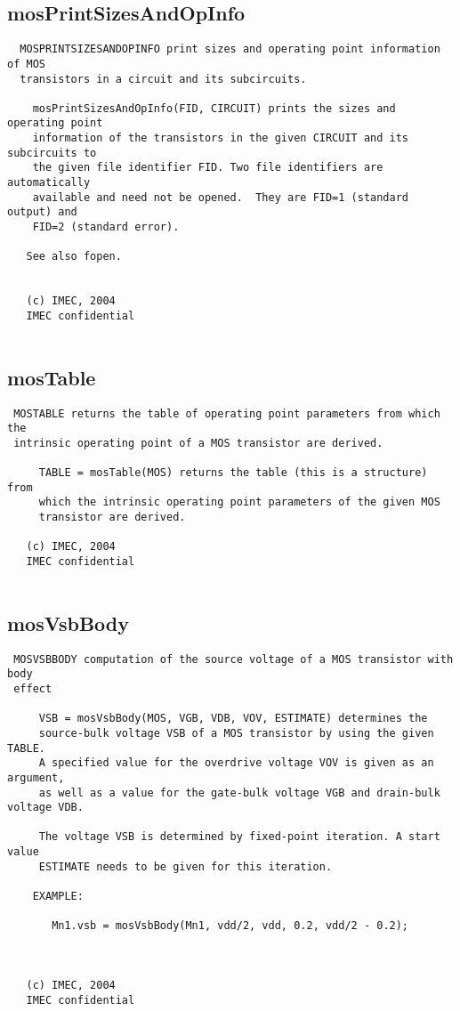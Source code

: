 \newpage
\subsection{mosPrintSizesAndOpInfo}
\label{sec:mosPrintSizesAndOpInfo}
\begin{verbatim}
  MOSPRINTSIZESANDOPINFO print sizes and operating point information of MOS
  transistors in a circuit and its subcircuits.
 
    mosPrintSizesAndOpInfo(FID, CIRCUIT) prints the sizes and operating point
    information of the transistors in the given CIRCUIT and its subcircuits to
    the given file identifier FID. Two file identifiers are automatically
    available and need not be opened.  They are FID=1 (standard output) and
    FID=2 (standard error).
 
   See also fopen.
 
 
   (c) IMEC, 2004
   IMEC confidential 
 

\end{verbatim}

\newpage
\subsection{mosTable}
\label{sec:mosTable}
\begin{verbatim}
 MOSTABLE returns the table of operating point parameters from which the
 intrinsic operating point of a MOS transistor are derived.
 
     TABLE = mosTable(MOS) returns the table (this is a structure) from
     which the intrinsic operating point parameters of the given MOS
     transistor are derived. 
 
   (c) IMEC, 2004
   IMEC confidential 
 

\end{verbatim}

\newpage
\subsection{mosVsbBody}
\label{sec:mosVsbBody}
\begin{verbatim}
 MOSVSBBODY computation of the source voltage of a MOS transistor with body
 effect
 
     VSB = mosVsbBody(MOS, VGB, VDB, VOV, ESTIMATE) determines the
     source-bulk voltage VSB of a MOS transistor by using the given TABLE. 
     A specified value for the overdrive voltage VOV is given as an argument, 
     as well as a value for the gate-bulk voltage VGB and drain-bulk voltage VDB. 
 
     The voltage VSB is determined by fixed-point iteration. A start value
     ESTIMATE needs to be given for this iteration.
 
    EXAMPLE:
     
       Mn1.vsb = mosVsbBody(Mn1, vdd/2, vdd, 0.2, vdd/2 - 0.2);
 
 
 
   (c) IMEC, 2004
   IMEC confidential 
 

\end{verbatim}

